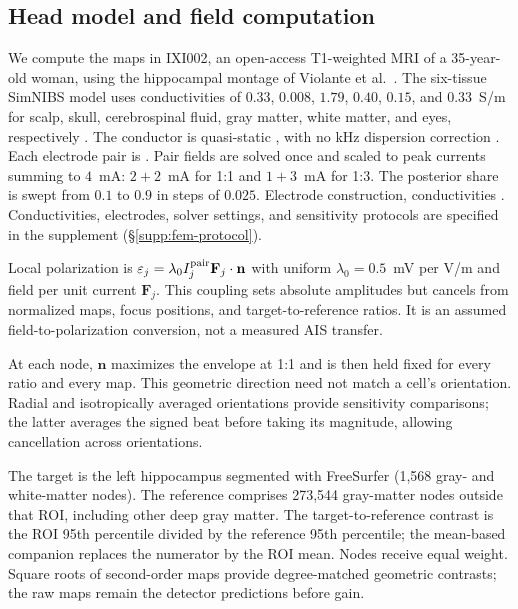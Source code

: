 \documentclass[11pt,a4paper]{article}
\newif\ifjne
\providecommand{\DIFaddtex}[1]{{\protect\color{blue} \sf #1}} %
\providecommand{\DIFdeltex}[1]{{\protect\color{red} \scriptsize #1}} %
\providecommand{\DIFaddbegin}{} %
\providecommand{\DIFaddend}{} %
\providecommand{\DIFdelbegin}{} %
\providecommand{\DIFdelend}{} %
\providecommand{\DIFadd}[1]{\texorpdfstring{\DIFaddtex{#1}}{#1}} %
\providecommand{\DIFdel}[1]{\texorpdfstring{\DIFdeltex{#1}}{}} %
\begin{document}
\DIFaddend \subsection{Head model and field computation}\label{sec:fem-methods}
\ifjne
We compute \DIFdelbegin \DIFdel{the }\DIFdelend maps in IXI002, an open-access T1-weighted MRI of a 35-year-old
woman, using the hippocampal montage of Violante et al.\ \cite{violante2023}.
The six-tissue SimNIBS \DIFdelbegin \DIFdel{model uses conductivities of $0.33$, $0.008$, $1.79$,
$0.40$, $0.15$, and $0.33$~S/m for scalp, skull, cerebrospinal fluid, gray matter,
white matter, and eyes, respectively \cite{salvador2025}. The }\DIFdelend conductor is quasi-static \DIFdelbegin \DIFdel{, }\DIFdelend with no kHz dispersion correction
\DIFdelbegin \DIFdel{. Each electrode pair is }\DIFdelend \DIFaddbegin \DIFadd{\cite{salvador2025}. Pair fields are }\DIFaddend solved once and scaled to peak currents
summing to $4$~mA: $2+2$~mA for 1:1 and $1+3$~mA for 1:3. The posterior share
is swept from $0.1$ to $0.9$\DIFdelbegin \DIFdel{in steps of $0.025$. Electrode construction, conductivities}\DIFdelend \DIFaddbegin \DIFadd{. Conductivities, electrodes}\DIFaddend , solver settings,
and sensitivity protocols are \DIFdelbegin \DIFdel{specified }\DIFdelend in the supplement (\S\ref{supp:fem-protocol}).

Local polarization is $\varepsilon_j=\lambda_0 I_j^{\rm pair}\mathbf F_j\cdot\mathbf n$
with uniform $\lambda_0=0.5$~mV per V/m \cite{radman2009} and field per unit
current $\mathbf F_j$. This coupling sets absolute amplitudes but cancels from
normalized maps, focus positions, and target-to-reference ratios. It is an
assumed field-to-polarization conversion, not a measured AIS transfer.

At each node, $\mathbf n$ maximizes the envelope at 1:1 and is then held fixed
for every ratio and every map. This geometric direction need not match a cell's
orientation. Radial and isotropically averaged orientations provide sensitivity
comparisons; the latter averages the signed beat before taking its magnitude,
allowing cancellation across orientations.

The target is the left hippocampus segmented with FreeSurfer (1,568 gray- and
white-matter nodes). The reference comprises 273,544 gray-matter nodes outside
that ROI, including other deep gray matter. The target-to-reference contrast
is the ROI 95th percentile divided by the reference 95th percentile; the
mean-based companion replaces the numerator by the ROI mean. Nodes receive
equal weight. Square roots of second-order maps provide degree-matched geometric
contrasts; the raw maps remain the detector predictions before gain.
\end{document}
